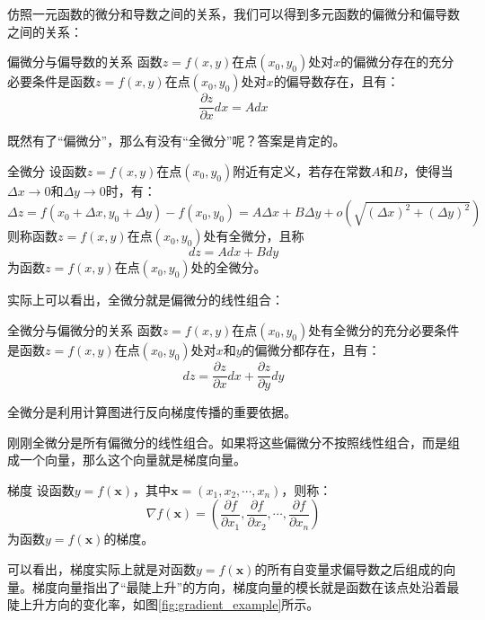 仿照一元函数的微分和导数之间的关系，我们可以得到多元函数的偏微分和偏导数之间的关系：
\begin{theorem}{偏微分与偏导数的关系}{}
    函数$z = f(x, y)$在点$(x_0, y_0)$处对$x$的偏微分存在的充分必要条件是函数$z = f(x, y)$在点$(x_0, y_0)$处对$x$的偏导数存在，且有：
    \begin{equation}
        \frac{\partial z}{\partial x} dx = A dx
    \end{equation}
\end{theorem}

既然有了“偏微分”，那么有没有“全微分”呢？答案是肯定的。
\begin{definition}{全微分}{}
设函数$z = f(x, y)$在点$(x_0, y_0)$附近有定义，若存在常数$A$和$B$，使得当$\Delta x \to 0$和$\Delta y \to 0$时，有：
\begin{equation}
    \Delta z = f(x_0 + \Delta x, y_0 + \Delta y) - f(x_0, y_0) = A \Delta x + B \Delta y + o(\sqrt{(\Delta x)^2 + (\Delta y)^2})
\end{equation}
则称函数$z = f(x, y)$在点$(x_0, y_0)$处有全微分，且称
\begin{equation}
    dz = A dx + B dy
\end{equation}
为函数$z = f(x, y)$在点$(x_0, y_0)$处的全微分。
\end{definition}

实际上可以看出，全微分就是偏微分的线性组合：
\begin{theorem}{全微分与偏微分的关系}{}
    函数$z = f(x, y)$在点$(x_0, y_0)$处有全微分的充分必要条件是函数$z = f(x, y)$在点$(x_0, y_0)$处对$x$和$y$的偏微分都存在，且有：
    \begin{equation}
        dz = \frac{\partial z}{\partial x} dx + \frac{\partial z}{\partial y} dy
    \end{equation}
\end{theorem}
全微分是利用计算图进行反向梯度传播的重要依据。

刚刚全微分是所有偏微分的线性组合。如果将这些偏微分不按照线性组合，而是组成一个向量，那么这个向量就是梯度向量。
\begin{definition}{梯度}{}
    设函数$y = f(\mathbf{x})$，其中$\mathbf{x} = (x_1, x_2, \cdots, x_n)$，则称：
    \begin{equation}
        \nabla f(\mathbf{x}) = \left( \frac{\partial f}{\partial x_1}, \frac{\partial f}{\partial x_2}, \cdots, \frac{\partial f}{\partial x_n} \right)
    \end{equation}
    为函数$y = f(\mathbf{x})$的梯度。
\end{definition}
可以看出，梯度实际上就是对函数$y = f(\mathbf{x})$的所有自变量求偏导数之后组成的向量。梯度向量指出了“最陡上升”的方向，梯度向量的模长就是函数在该点处沿着最陡上升方向的变化率，如图\cref{fig:gradient_example}所示。

